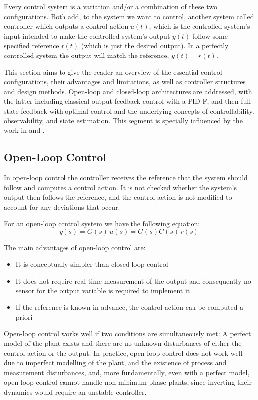 \documentclass[  10pt, twoside]{report} %
\numberwithin{equation}{chapter}
\begin{document}
Every control system is a variation and/or a combination of these two configurations. Both add, to the system we want to control, another system called controller which outputs a control action $u(t)$, which is the controlled system's input intended to make the controlled system's output $y(t)$ follow some specified reference $r(t)$ (which is just the desired output).  In a perfectly controlled system the output will match the reference, $y(t) = r(t)$. 

This section aims to give the reader an overview of the essential control configurations, their advantages and limitations, as well as controller structures and design methods. Open-loop and closed-loop architectures are addressed, with the latter including classical output feedback control with a PID-F, and then full state feedback with optimal control and the underlying concepts of controllability, observability, and state estimation. This segment is specially influenced by the work in \cite{DuarteValerio} and \cite{Botto}.

\subsection{Open-Loop Control}
In open-loop control the controller receives the reference that the system should follow and computes a control action.  It is not checked whether the system's output then follows the reference, and the control action is not modified to account for any deviations that occur.

For an open-loop control system we have the following equation:
\begin{equation}
    y(s) = G(s) \, u(s) = G(s)C(s) \, r(s) 
\end{equation}

The main advantages of open-loop control are:
\begin{itemize}
    \item It is conceptually simpler than closed-loop control
    \item It does not require real-time measurement of the output and consequently no sensor for the output variable is required to implement it
    \item If the reference is known in advance, the control action can be computed a priori
\end{itemize}  

Open-loop control works well if two conditions are simultaneously met: A perfect model of the plant exists and there are no unknown disturbances of either the control action or the output. In practice, open-loop control does not work well due to imperfect modelling of the plant, and the existence of process and measurement disturbances, and, more fundamentally, even with a perfect model, open-loop control cannot handle non-minimum phase plants, since inverting their dynamics would require an unstable controller.
\end{document}
